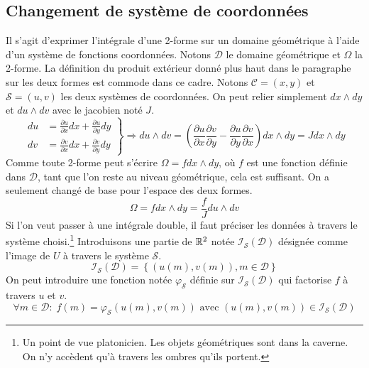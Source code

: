 \subsection{Changement de système de coordonnées}
Il s'agit d'exprimer l'intégrale d'une 2-forme sur un domaine géométrique à l'aide d'un système de fonctions coordonnées. Notons $\mathcal D$ le domaine géométrique et $\Omega$ la 2-forme.\newline
La définition du produit extérieur donné plus haut dans le paragraphe sur les deux formes est commode dans ce cadre. Notons $\mathcal C = (x,y)$ et $\mathcal S=(u,v)$ les deux systèmes de coordonnées. On peut relier simplement $dx\wedge dy$ et $du\wedge dv$ avec le jacobien noté $J$. 
\begin{displaymath}
 \left. 
\begin{aligned}
 du &= \frac{\partial u}{\partial x}dx + \frac{\partial u}{\partial y}dy \\ 
 dv &= \frac{\partial v}{\partial x}dx + \frac{\partial v}{\partial y}dy 
\end{aligned}
\right\rbrace \Rightarrow
du\wedge dv = \left(
 \frac{\partial u}{\partial x}\frac{\partial v}{\partial y}
- \frac{\partial u}{\partial y}\frac{\partial v}{\partial x}
 \right) dx\wedge dy = J dx\wedge dy
\end{displaymath}
Comme toute 2-forme peut s'écrire $\Omega = fdx\wedge dy$, où $f$ est une fonction définie dans $\mathcal D$, tant que l'on reste au niveau géométrique, cela est suffisant. On a seulement changé de base pour l'espace des deux formes.
\begin{displaymath}
 \Omega = fdx\wedge dy = \frac{f}{J}du\wedge dv
\end{displaymath}
 Si l'on veut passer à une intégrale double, il faut préciser les données à travers le système choisi.\footnote{Un point de vue platonicien. Les objets géométriques sont dans la caverne. On n'y accèdent qu'à travers les ombres qu'ils portent.}\newline
Introduisons une partie de $\mathbb{R}^2$ notée $\mathcal I_{\mathcal S}(\mathcal D)$ désignée comme l'image de $U$ à travers le système $\mathcal S$.
\begin{displaymath}
 \mathcal I_{\mathcal S}(\mathcal D)=
\left\lbrace (u(m),v(m)), m\in \mathcal D \right\rbrace 
\end{displaymath}
On peut introduire une fonction notée $\varphi_{\mathcal S}$ définie sur $\mathcal I_{\mathcal S}(\mathcal D)$ qui factorise $f$ à travers $u$ et $v$.
\begin{displaymath}                                                                                                                                                       
\forall m\in \mathcal D:\; f(m)=\varphi_{\mathcal S}(u(m),v(m))\text{ avec } (u(m),v(m))\in \mathcal I_{\mathcal S}(\mathcal D)
\end{displaymath}
